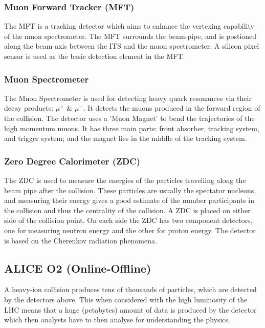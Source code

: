 \documentclass[12pt,a4paper,twoside]{report}
\begin{document}
\subsubsection{Muon Forward Tracker (MFT)}
The MFT is a tracking detector which aims to enhance the vertexing capability of the muon spectrometer. The MFT surrounds the beam-pipe, and is postioned along the beam axis between the ITS and the muon spectrometer. A silicon pixel sensor is used as the basic detection element in the MFT.
\subsubsection{Muon Spectrometer}
The Muon Spectrometer is used for detecting heavy quark resonances via their decay products: $\mu^{+}$ \& $\mu^{-}$. It detects the muons produced in the forward region of the collision. The detector uses a 'Muon Magnet' to bend the trajectories of the high momentum muons. It has three main parts: front absorber, tracking system, and trigger system; and the magnet lies in the middle of the tracking system.
\subsubsection{Zero Degree Calorimeter (ZDC)}
The ZDC is used to measure the energies of the particles travelling along the beam pipe after the collision. These particles are usually the spectator nucleons, and measuring their energy gives a good estimate of the number participants in the collision and thus the centrality of the collision. A ZDC is placed on either side of the collision point. On each side the ZDC has two component detectors, one for measuring neutron energy and the other for proton energy. The detector is based on the Cherenkov radiation phenomena.
\subsection{ALICE O2 (Online-Offline)}
A heavy-ion collision produces tens of thousands of particles, which are detected by the detectors above. This when considered with the high luminosity of the LHC means that a huge (petabytes) amount of data is produced by the detector which then analysts have to then analyse for understanding the physics.\\<Mention how data is collected reconstructed and stored>\\
\end{document}
